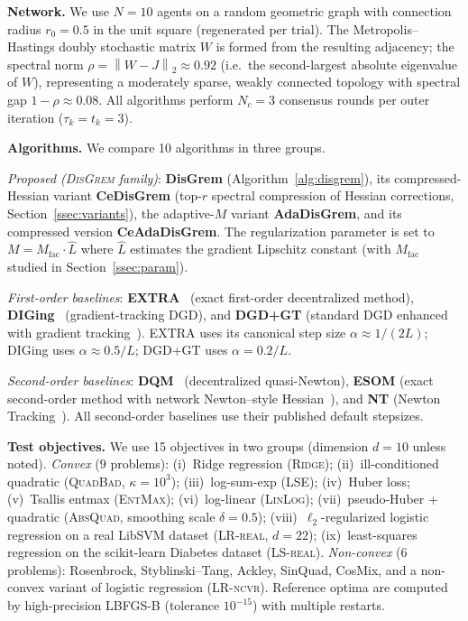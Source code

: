 \documentclass[11pt,a4paper]{article}
\def\one{1}%
\def\J{J}%
\newcommand{\one}{\mathbf{1}}
\newcommand{\normtwo}[1]{\left\|#1\right\|_2}
\newcommand{\J}{\left(\frac{1}{N}\one\one^\top\right)}
\begin{document}
	\noindent\textbf{Network.}
	We use $N=10$ agents on a random geometric graph with connection radius $r_0=0.5$
	in the unit square (regenerated per trial).
	The Metropolis--Hastings doubly stochastic matrix $W$ is formed from the resulting
	adjacency; the spectral norm $\rho=\normtwo{W-\J}\approx 0.92$ (i.e.\ the
	second-largest absolute eigenvalue of $W$), representing a moderately sparse,
	weakly connected topology with spectral gap $1-\rho\approx 0.08$.
	All algorithms perform $N_c=3$ consensus rounds per outer iteration ($\tau_k=t_k=3$).
	
	\noindent\textbf{Algorithms.}
	We compare 10 algorithms in three groups.
	
	\noindent\textit{Proposed (\textsc{DisGrem} family)}:
	\textbf{DisGrem} (Algorithm~\ref{alg:disgrem}), its compressed-Hessian variant \textbf{CeDisGrem}
	(top-$r$ spectral compression of Hessian corrections, Section~\ref{ssec:variants}),
	the adaptive-$M$ variant \textbf{AdaDisGrem}, and its compressed version \textbf{CeAdaDisGrem}.
	The regularization parameter is set to $M = M_{\mathrm{fac}} \cdot \hat L$
	where $\hat L$ estimates the gradient Lipschitz constant
	(with $M_{\mathrm{fac}}$ studied in Section~\ref{ssec:param}).
	
	\noindent\textit{First-order baselines}:
	\textbf{EXTRA}~\citep{shi2015extra} (exact first-order decentralized method),
	\textbf{DIGing}~\citep{nedic2017diging} (gradient-tracking DGD),
	and \textbf{DGD+GT} (standard DGD enhanced with gradient tracking~\citep{nedic2009subgradient}).
	EXTRA uses its canonical step size $\alpha\approx 1/(2L)$;
	DIGing uses $\alpha\approx 0.5/L$; DGD+GT uses $\alpha=0.2/L$.
	
	\noindent\textit{Second-order baselines}:
	\textbf{DQM}~\citep{eisen2017dqn} (decentralized quasi-Newton),
	\textbf{ESOM} (exact second-order method with network Newton--style Hessian~\citep{mokhtari2015networknewton_arxiv}),
	and \textbf{NT} (Newton Tracking~\citep{mokhtari2020newtontracking}).
	All second-order baselines use their published default stepsizes.
	
	\noindent\textbf{Test objectives.}
	We use 15 objectives in two groups (dimension $d=10$ unless noted).
	\textit{Convex} ($9$ problems): (i)~Ridge regression (\textsc{Ridge}); (ii)~ill-conditioned
	quadratic (\textsc{QuadBad}, $\kappa=10^3$); (iii)~log-sum-exp (\textsc{LSE}); (iv)~Huber loss;
	(v)~Tsallis entmax (\textsc{EntMax}); (vi)~log-linear (\textsc{LinLog});
	(vii)~pseudo-Huber + quadratic (\textsc{AbsQuad}, smoothing scale $\delta=0.5$);
	(viii)~$\ell_2$-regularized logistic regression on a real LibSVM dataset
	(\textsc{LR-real}, $d=22$); (ix)~least-squares regression on the scikit-learn
	Diabetes dataset (\textsc{LS-real}).
	\textit{Non-convex} ($6$ problems): Rosenbrock, Styblinski--Tang, Ackley,
	SinQuad, CosMix, and a non-convex variant of logistic regression (\textsc{LR-ncvr}).
	Reference optima are computed by high-precision LBFGS-B (tolerance $10^{-15}$) with multiple restarts.
	
\end{document}
